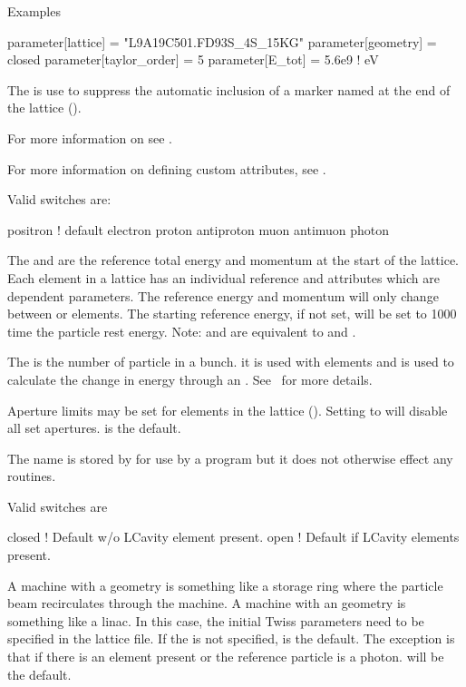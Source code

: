 \noindent
Examples
\begin{example}
  parameter[lattice]      = "L9A19C501.FD93S_4S_15KG"
  parameter[geometry]     = closed
  parameter[taylor_order] = 5
  parameter[E_tot]        = 5.6e9    ! eV
\end{example}

The  is use to suppress the automatic inclusion
of a marker named  at the end of the lattice (). 

For more information on  see .

For more information on defining custom attributes, see .

Valid  switches are:
\begin{example}
  positron  ! default
  electron
  proton
  antiproton
  muon
  antimuon
  photon
\end{example}

The  and  are the reference
total energy and momentum at the start of the lattice. Each element
in a lattice has an individual reference  and  attributes
which are dependent parameters. The reference energy and momentum will only
change between  or  elements. The starting
reference energy, if not set, will be set to 1000 time the particle
rest energy.  Note:  and  are
equivalent to  and .

The  is the number of particle in a bunch.
it is used with  elements and is used to calculate the
change in energy through an . See~ for more
details.

Aperture limits may be set for elements in the lattice
(). Setting  to  will
disable all set apertures.  is the default.

The  name is stored by \bmad for use by a program but it does
not otherwise effect any \bmad routines. 

\noindent
{}
Valid  switches are
\begin{example}
  closed  ! Default w/o LCavity element present.
  open    ! Default if LCavity elements present.
\end{example}
A machine with a  geometry is something like a storage ring
where the particle beam recirculates through the machine.  A machine
with an  geometry is something like a linac.  In this case,
the initial Twiss parameters need to be specified in the lattice
file. If the  is not specified,  is the
default. The exception is that if there is an  element
present or the reference particle is a photon.  will be the
default.

